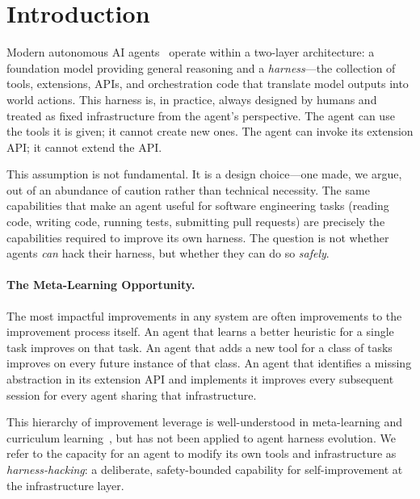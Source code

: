 \documentclass[11pt]{article}
\begin{document}
\section{Introduction}
\label{sec:intro}

Modern autonomous AI agents~\cite{openai2023gpt4, anthropic2024claude,
yang2024sweagent} operate within a two-layer architecture: a foundation model
providing general reasoning and a \emph{harness}---the collection of tools,
extensions, APIs, and orchestration code that translate model outputs into world
actions. This harness is, in practice, always designed by humans and treated as
fixed infrastructure from the agent's perspective. The agent can use the tools
it is given; it cannot create new ones. The agent can invoke its extension API;
it cannot extend the API.

This assumption is not fundamental. It is a design choice---one made, we argue,
out of an abundance of caution rather than technical necessity. The same
capabilities that make an agent useful for software engineering tasks (reading
code, writing code, running tests, submitting pull requests) are precisely the
capabilities required to improve its own harness. The question is not whether
agents \emph{can} hack their harness, but whether they can do so \emph{safely}.

\paragraph{The Meta-Learning Opportunity.}
The most impactful improvements in any system are often improvements to the
improvement process itself. An agent that learns a better heuristic for a single
task improves on that task. An agent that adds a new tool for a class of tasks
improves on every future instance of that class. An agent that identifies a
missing abstraction in its extension API and implements it improves every
subsequent session for every agent sharing that infrastructure.

This hierarchy of improvement leverage is well-understood in meta-learning and
curriculum learning~\cite{schmidhuber1987evolutionary,
thrun1998learning}, but has not been applied to agent harness evolution. We
refer to the capacity for an agent to modify its own tools and infrastructure as
\emph{harness-hacking}: a deliberate, safety-bounded capability for
self-improvement at the infrastructure layer.
\end{document}

